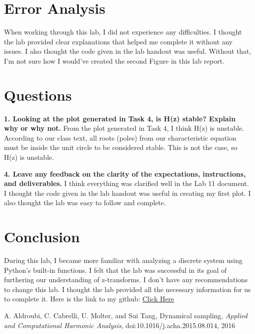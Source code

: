 \documentclass[12pt]{report}
\begin{document}
\newpage

\section{Error Analysis}

When working through this lab, I did not experience any difficulties. I thought the lab provided clear explanations that helped me complete it without any issues. I also thought the code given in the lab handout was useful. Without that, I'm not sure how I would've created the second Figure in this lab report. 



\section{Questions}

\textbf{1. Looking at the plot generated in Task 4, is H(z) stable? Explain why or why not.}
{From the plot generated in Task 4, I think H(z) is unstable. According to our class text, all roots (poles) from our characteristic equation must be inside the unit circle to be considered stable. This is not the case, so H(z) is unstable.   }


\textbf{4. Leave any feedback on the clarity of the expectations, instructions, and deliverables.}
{I think everything was clarified well in the Lab 11 document. I thought the code given in the lab handout was useful in creating my first plot. I also thought the lab was easy to follow and complete.}



\section{Conclusion}

During this lab, I became more familiar with analyzing a discrete system using Python's built-in functions. I felt that the lab was successful in its goal of furthering our understanding of z-transforms. I don't have any recommendations to change this lab. I thought the lab provided all the necessary information for us to complete it. Here is the link to my github: \href{https://github.com/JMac1999}{Click Here}




\begin{thebibliography}{111}

A. Aldroubi, C. Cabrelli, U. Molter, and Sui Tang,
Dynamical sampling, 
{\it  Applied and Computational Harmonic Analysis}, doi:10.1016/j.acha.2015.08.014, 2016


\end{thebibliography}
\end{document}
